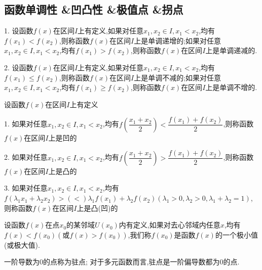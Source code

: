 \subsection{函数单调性 \&凹凸性 \&极值点 \&拐点}
\begin{definition}[单调性]
	1. 设函数$f(x)$在区间$I$上有定义,如果对任意$x_{1},x_{2}\in I,x_{1}<x_{2}$,均有$f(x_{1})<f(x_{2})$,则称函数$f(x)$在区间$I$上是单调递增的;如果对任意$x_{1},x_{2}\in I,x_{1}<x_{2}$,均有$f(x_{1})>f(x_{2})$,则称函数$f(x)$在区间$I$上是单调递减的.

	2. 设函数$f(x)$在区间$I$上有定义,如果对任意$x_{1},x_{2}\in I,x_{1}<x_{2}$,均有$f(x_{1})\leq f(x_{2})$,则称函数$f(x)$在区间$I$上是单调不减的;如果对任意$x_{1},x_{2}\in I,x_{1}<x_{2}$,均有$f(x_{1})\geq f(x_{2})$,则称函数$f(x)$在区间$I$上是单调不增的.
\end{definition}

\begin{definition}[凹凸性]
	设函数$f(x)$在区间$I$上有定义
	
	1. 如果对任意$x_{1},x_{2}\in I,x_{1}<x_{2}$,均有$f(\dfrac{x_{1}+x_{2}}{2}) < \dfrac{f(x_{1})+f(x_{2})}{2}$,则称函数$f(x)$在区间$I$上是凹的
	
	2. 如果对任意$x_{1},x_{2}\in I,x_{1}<x_{2}$,均有$f(\dfrac{x_{1}+x_{2}}{2}) > \dfrac{f(x_{1})+f(x_{2})}{2}$,则称函数$f(x)$在区间$I$上是凸的

	3. 如果对任意$x_{1},x_{2}\in I,x_{1}<x_{2}$,均有$f(\lambda_{1}x_{1} +\lambda_{2} x_{2}) >(<)\lambda_{1}f(x_{1}) +\lambda_{2}f(x_{2})(\lambda_{1}>0, \lambda_{2}>0, \lambda_{1}+\lambda_{2} = 1)$,则称函数$f(x)$在区间$I$上是凸(凹)的
\end{definition}

\begin{definition}[极值点]
	设函数$f(x)$在点$x_{0}$的某邻域$U(x_{0})$内有定义,如果对去心邻域内任意$x$,均有$f(x)<f(x_{0})(\text{或}f(x)>f(x_{0}))$,我们称$f(x_{0})$是函数$f(x)$的一个极小值(或极大值).
\end{definition}
\begin{definition}[驻点]
	一阶导数为$0$的点称为驻点; 对于多元函数而言,驻点是一阶偏导数都为$0$的点.
\end{definition}

